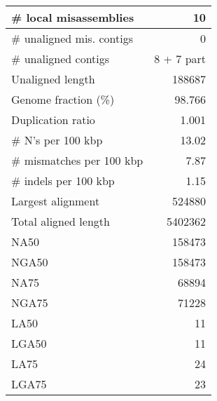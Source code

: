 \documentclass[12pt,a4paper]{article}
\begin{document}
\begin{table}[ht]
\begin{center}
\begin{tabular}{|l*{1}{|r}|}
\# local misassemblies & 10 \\ \hline
\# unaligned mis. contigs & 0 \\ \hline
\# unaligned contigs & 8 + 7 part \\ \hline
Unaligned length & 188687 \\ \hline
Genome fraction (\%) & 98.766 \\ \hline
Duplication ratio & 1.001 \\ \hline
\# N's per 100 kbp & 13.02 \\ \hline
\# mismatches per 100 kbp & 7.87 \\ \hline
\# indels per 100 kbp & 1.15 \\ \hline
Largest alignment & 524880 \\ \hline
Total aligned length & 5402362 \\ \hline
NA50 & 158473 \\ \hline
NGA50 & 158473 \\ \hline
NA75 & 68894 \\ \hline
NGA75 & 71228 \\ \hline
LA50 & 11 \\ \hline
LGA50 & 11 \\ \hline
LA75 & 24 \\ \hline
LGA75 & 23 \\ \hline
\end{tabular}
\end{center}
\end{table}
\end{document}
